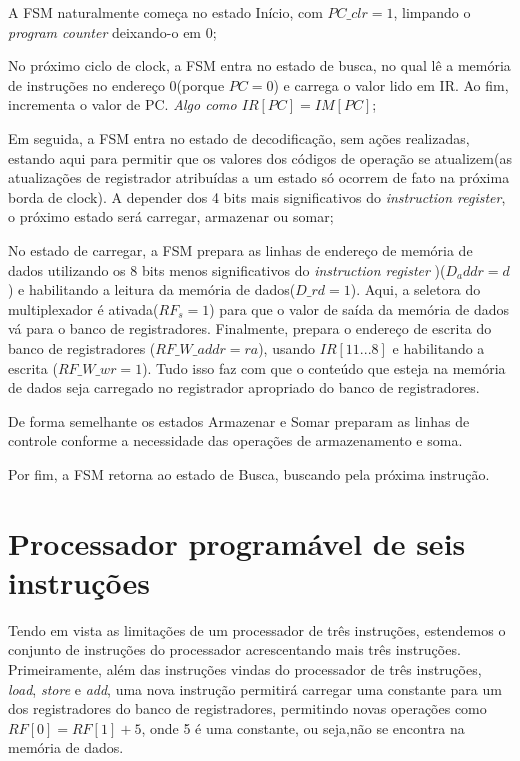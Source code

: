 \documentclass{article}
\begin{document}
\begin{boxlabel}
     \item A FSM naturalmente começa no estado Início, com $PC\_clr=1$, limpando o \textit{program counter} deixando-o em 0;
     \item No próximo ciclo de clock, a FSM entra no estado de busca, no qual lê a memória de instruções no endereço 0(porque $PC=0$) e carrega o valor lido em IR. Ao fim, incrementa o valor de PC. \textit{Algo como $IR[PC]=IM[PC]$};
     \item Em seguida, a FSM entra no estado de decodificação, sem ações realizadas, estando aqui para permitir que os valores dos códigos de operação se atualizem(as atualizações de registrador atribuídas a um estado só ocorrem de fato na próxima borda de clock). A depender dos 4 bits mais significativos do \textit{instruction register}, o próximo estado será carregar, armazenar ou somar;
     \item No estado de carregar, a FSM prepara as linhas de endereço de memória de dados utilizando os 8 bits menos significativos do \textit{instruction register} )($D_addr=d$) e habilitando a leitura da memória de dados($D\_rd=1$). Aqui, a seletora do multiplexador é ativada($RF_s=1$) para que o valor de saída da memória de dados vá para o banco de registradores. Finalmente, prepara o endereço de escrita do banco de registradores ($RF\_W\_addr=ra$), usando $IR[11...8]$ e habilitando a escrita ($RF\_W\_wr=1$). Tudo isso faz com que o conteúdo que esteja na memória de dados seja carregado no registrador apropriado do banco de registradores.
     \item De forma semelhante os estados Armazenar e Somar preparam as linhas de controle conforme a necessidade das operações de armazenamento e soma.
     \item Por fim, a FSM retorna ao estado de Busca, buscando pela próxima instrução.
\end{boxlabel}

\section{Processador programável de seis instruções}
Tendo em vista as limitações de um processador de três instruções, estendemos o conjunto de instruções do processador acrescentando mais três instruções.
Primeiramente, além das instruções vindas do processador de três instruções, \textit{load}, \textit{store} e \textit{add}, uma nova instrução permitirá carregar uma constante para um dos registradores do banco de registradores, permitindo novas operações como $RF[0]=RF[1]+5$, onde 5 é uma constante, ou seja,não se encontra na memória de dados.
\end{document}

